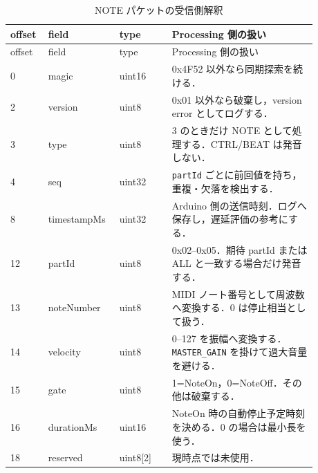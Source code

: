 \documentclass[lualatex,book,openany,paper=a4paper,jafontsize=11.5pt,jafontscale=1.05]{jlreq}
\begin{document}
\begin{longtable}{p{0.10\linewidth}p{0.18\linewidth}p{0.16\linewidth}p{0.44\linewidth}}
\caption{NOTE パケットの受信側解釈}\label{tab:note}\\
\toprule
offset & field & type & Processing 側の扱い \\
\midrule
\endfirsthead
\toprule
offset & field & type & Processing 側の扱い \\
\midrule
\endhead
0 & magic & uint16 & 0x4F52 以外なら同期探索を続ける． \\
2 & version & uint8 & 0x01 以外なら破棄し，version error としてログする． \\
3 & type & uint8 & 3 のときだけ NOTE として処理する．CTRL/BEAT は発音しない． \\
4 & seq & uint32 & \texttt{partId} ごとに前回値を持ち，重複・欠落を検出する． \\
8 & timestampMs & uint32 & Arduino 側の送信時刻．ログへ保存し，遅延評価の参考にする． \\
12 & partId & uint8 & 0x02--0x05．期待 partId または ALL と一致する場合だけ発音する． \\
13 & noteNumber & uint8 & MIDI ノート番号として周波数へ変換する．0 は停止相当として扱う． \\
14 & velocity & uint8 & 0--127 を振幅へ変換する．\texttt{MASTER\_GAIN} を掛けて過大音量を避ける． \\
15 & gate & uint8 & 1=NoteOn，0=NoteOff．その他は破棄する． \\
16 & durationMs & uint16 & NoteOn 時の自動停止予定時刻を決める．0 の場合は最小長を使う． \\
18 & reserved & uint8[2] & 現時点では未使用． \\
\bottomrule
\end{longtable}
\end{document}
